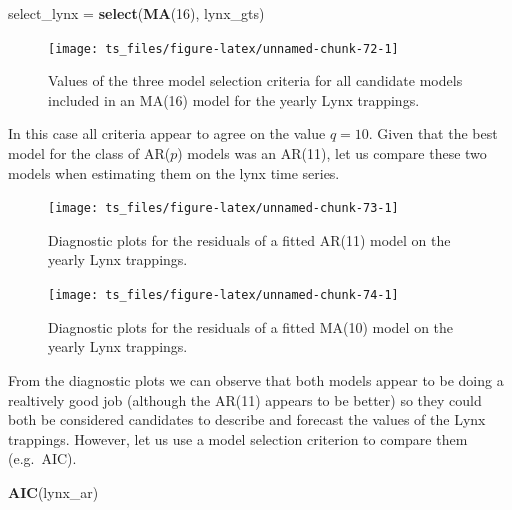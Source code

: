 \documentclass[]{book}
\newenvironment{Shaded}{\begin{snugshade}}{\end{snugshade}}
\newcommand{\KeywordTok}[1]{\textcolor[rgb]{0.13,0.29,0.53}{\textbf{#1}}}
\newcommand{\DecValTok}[1]{\textcolor[rgb]{0.00,0.00,0.81}{#1}}
\newcommand{\StringTok}[1]{\textcolor[rgb]{0.31,0.60,0.02}{#1}}
\newcommand{\NormalTok}[1]{#1}
\theoremstyle{definition}
\theoremstyle{definition}
\theoremstyle{definition}
\theoremstyle{remark}
\begin{document}
\begin{Shaded}
\begin{Highlighting}[]
\NormalTok{select_lynx =}\StringTok{ }\KeywordTok{select}\NormalTok{(}\KeywordTok{MA}\NormalTok{(}\DecValTok{16}\NormalTok{), lynx_gts)}
\end{Highlighting}
\end{Shaded}

\begin{figure}

{\centering \texttt{[image: ts\_files/figure-latex/unnamed-chunk-72-1]} 

}

\caption{Values of the three model selection criteria for all candidate models included in an MA(16) model for the yearly Lynx trappings.}\label{fig:unnamed-chunk-72}
\end{figure}

In this case all criteria appear to agree on the value \(q = 10\). Given
that the best model for the class of AR(\(p\)) models was an AR(11), let
us compare these two models when estimating them on the lynx time
series.

\begin{figure}

{\centering \texttt{[image: ts\_files/figure-latex/unnamed-chunk-73-1]} 

}

\caption{Diagnostic plots for the residuals of a fitted AR(11) model on the yearly Lynx trappings.}\label{fig:unnamed-chunk-73}
\end{figure}

\begin{figure}

{\centering \texttt{[image: ts\_files/figure-latex/unnamed-chunk-74-1]} 

}

\caption{Diagnostic plots for the residuals of a fitted MA(10) model on the yearly Lynx trappings.}\label{fig:unnamed-chunk-74}
\end{figure}

From the diagnostic plots we can observe that both models appear to be
doing a realtively good job (although the AR(11) appears to be better)
so they could both be considered candidates to describe and forecast the
values of the Lynx trappings. However, let us use a model selection
criterion to compare them (e.g.~AIC).

\begin{Shaded}
\begin{Highlighting}[]
\KeywordTok{AIC}\NormalTok{(lynx_ar)}
\end{Highlighting}
\end{Shaded}
\end{document}
